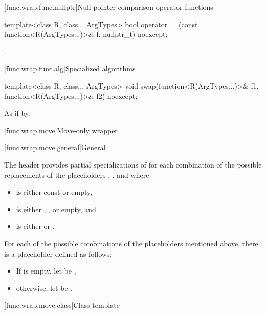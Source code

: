 [func.wrap.func.nullptr]{Null pointer comparison operator functions}

%
\begin{itemdecl}
template<class R, class... ArgTypes>
  bool operator==(const function<R(ArgTypes...)>& f, nullptr_t) noexcept;
\end{itemdecl}

\begin{itemdescr}
\pnum
\returns
{}.
\end{itemdescr}

[func.wrap.func.alg]{Specialized algorithms}

%
\begin{itemdecl}
template<class R, class... ArgTypes>
  void swap(function<R(ArgTypes...)>& f1, function<R(ArgTypes...)>& f2) noexcept;
\end{itemdecl}

\begin{itemdescr}
\pnum
\effects
As if by: 
\end{itemdescr}%

[func.wrap.move]{Move-only wrapper}

[func.wrap.move.general]{General}

\pnum
The header provides partial specializations of 
for each combination of the possible replacements
of the placeholders \cv{}, , and  where
\begin{itemize}
\item
\cv{} is either const or empty,
\item
{} is either \tcode{\&}, \tcode{\&\&}, or empty, and
\item
{} is either  or .
\end{itemize}

\pnum
For each of the possible combinations of the placeholders mentioned above,
there is a placeholder  defined as follows:
\begin{itemize}
\item
If  is empty, let  be \cv{}\tcode{\&},
\item
otherwise, let  be \cv{} .
\end{itemize}

[func.wrap.move.class]{Class template }

